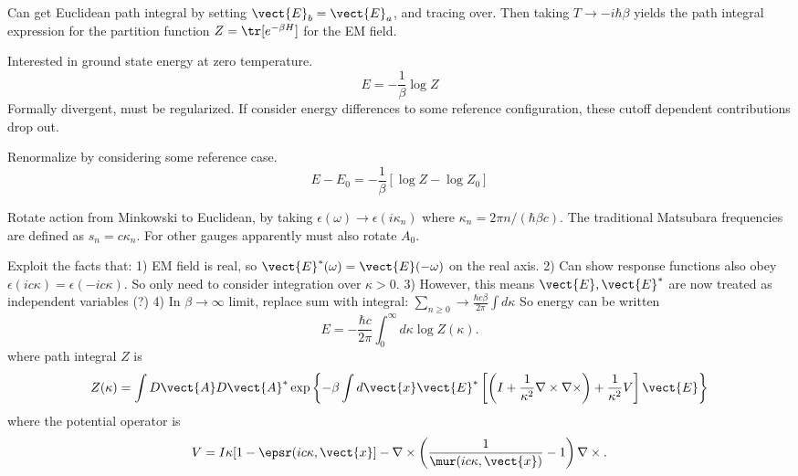 Can get Euclidean path integral by setting $\vect{E}_b=\vect{E}_a$, and tracing over.  Then taking
$T\rightarrow -i\hbar \beta$ yields the path integral expression for the partition function
$Z=\tr[e^{-\beta H}]$ for the EM field.  

Interested in ground state energy at zero temperature.  
\begin{equation}
E=-\frac{1}{\beta}\log Z
\end{equation}
Formally divergent, must be regularized.  If consider energy differences to some reference configuration,
these cutoff dependent contributions drop out.  

Renormalize by considering some reference case.
\begin{equation}
E-E_0=-\frac{1}{\beta}[\log Z-\log Z_0]
\end{equation}

Rotate action from Minkowski to Euclidean, by taking $\epsilon(\omega)\rightarrow\epsilon(i\kappa_n)$
where $\kappa_n=2\pi n/(\hbar\beta c)$.  The traditional Matsubara frequencies are defined as $s_n=c\kappa_n$.
  For other gauges apparently must also rotate $A_0$.  

Exploit the facts that:
1) EM field is real, so $\vect{E}^*(\omega)=\vect{E}(-\omega)$ on the real axis.  
2) Can show response functions also obey $\epsilon(ic\kappa)=\epsilon(-ic\kappa)$.  So only need
to consider integration over $\kappa>0$.  
3) However, this means $\vect{E},\vect{E}^*$ are now treated as independent variables (?)
4) In $\beta\rightarrow \infty$ limit, replace sum with integral:
$\sum_{n\ge 0} \rightarrow \frac{\hbar c\beta}{2\pi}\int d\kappa$
So energy can be written
\begin{equation}
E = -\frac{\hbar c}{2\pi}\int_0^\infty d\kappa \log Z(\kappa).
\end{equation}
where path integral $Z$ is
\begin{align}
Z(\kappa)=\int D\vect{A}D\vect{A}^*\exp\left\{-\beta\int d\vect{x}\vect{E}^*\left[
\left(I+\frac{1}{\kappa^2}\nabla\times\nabla\times\right)+\frac{1}{\kappa^2}V\right]\vect{E}\right\}
\end{align}
where the potential operator is
\begin{equation}
V=I\kappa[1-\epsr(ic\kappa,\vect{x}]-\nabla\times\left(\frac{1}{\mur(ic\kappa,\vect{x})}-1\right)\nabla\times.
\end{equation}

